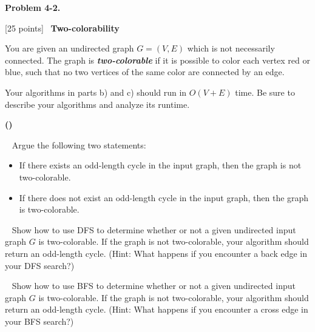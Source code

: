 \documentclass[12pt,oneside]{article}
\makeatletter
\newcounter{problemnum}
\newcommand{\theproblem}{Problem \theproblemsetnum-\theproblemnum}
\newenvironment{problems}{
        \begin{list}{{\bf \theproblem. \hspace*{0.5em}}}
        {\setlength{\leftmargin}{0em}
         \setlength{\rightmargin}{0em}
         \setlength{\labelwidth}{0em}
         \setlength{\labelsep}{0em}
         \usecounter{problemnum}}}{\end{list}}
\newcommand{\problem}[1][{}]{\item \let\@currentlabel=\theproblem \textbf{#1}}
\newcounter{problempartnum}[problemnum]
\newenvironment{problemparts}{
        \begin{list}{{\bf (\alph{problempartnum})}}
        {\setlength{\leftmargin}{2.5em}
         \setlength{\rightmargin}{2.5em}
         \setlength{\labelsep}{0.5em}}}{\end{list}}
\newcommand{\problempart}{\addtocounter{problempartnum}{1}\item}
\newcommand{\points}[1]{[#1 points]\ }
\newcommand{\defn}[1]{{\boldmath\textit{\textbf{#1}}}}
\newcommand{\theproblemsetnum}{4}
\renewcommand{\theproblemnum}{2}
\makeatother
\begin{document}
\begin{problems}

\problem \points{25} \textbf{Two-colorability}

You are given an undirected graph $G=(V, E)$ which is not necessarily
connected. The graph is \defn{two-colorable} if it is possible to
color each vertex red or blue, such that no two vertices of the same
color are connected by an edge.

Your algorithms in parts b) and c) should run in $O(V+E)$ time. Be sure to describe your
algorithms and analyze its runtime.

\begin{problemparts}
\problempart \points{5}
Argue the following two statements:

\begin{itemize}
\item If there exists an odd-length cycle in the input graph, then the graph is not two-colorable.
\item If there does not exist an odd-length cycle in the input graph, then the graph is two-colorable.
\end{itemize}


\problempart \points{10}
Show how to use DFS to determine whether or not a given undirected input graph $G$ is two-colorable. If the graph is not two-colorable, your algorithm should return an odd-length cycle. (Hint: What happens if you encounter a back edge in your DFS search?)


\problempart \points{10}
Show how to use BFS to determine whether or not a given undirected input graph $G$ is two-colorable. If the graph is not two-colorable, your algorithm should return an odd-length cycle. (Hint: What happens if you encounter a cross edge in your BFS search?)


\end{problemparts}


\end{problems}
\end{document}
